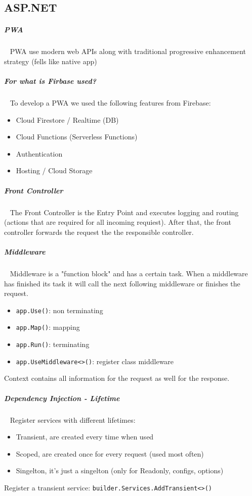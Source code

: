 \documentclass[11pt,twoside,landscape]{article}
\begin{document}
\begin{multicols}{4}
\section{ASP.NET}
\label{sec:org9b02759}
\subparagraph{PWA} \
\label{sec:org0b87818}
PWA use modern web APIs along with traditional progressive enhancement strategy (fells like native app)
\subparagraph{For what is Firbase used?} \
\label{sec:org6e1d08f}
To develop a PWA we used the following features from Firebase:
\begin{itemize}
\item Cloud Firestore / Realtime (DB)
\item Cloud Functions (Serverless Functions)
\item Authentication
\item Hosting / Cloud Storage
\end{itemize}
\subparagraph{Front Controller} \
\label{sec:org47d97a4}
The Front Controller is the Entry Point and executes logging and routing (actions that are required for all incoming requiest).
After that, the front controller forwards the request the the responsible controller.
\subparagraph{Middleware} \
\label{sec:org8682ac8}
Middleware is a "function block" and has a certain task.
When a middleware has finished its task it will call the next following middleware or finishes the request.
\begin{itemize}
\item \texttt{app.Use()}: non terminating
\item \texttt{app.Map()}: mapping
\item \texttt{app.Run()}: terminating
\item \texttt{app.UseMiddleware<>()}: register class middleware
\end{itemize}

Context contains all information for the request as well for the response.
\subparagraph{Dependency Injection - Lifetime} \
\label{sec:org3cf1800}
Register services with different lifetimes:
\begin{itemize}
\item Transient, are created every time when used
\item Scoped, are created once for every request (used most often)
\item Singelton, it's just a singelton (only for Readonly, configs, options)
\end{itemize}


Register a transient service: \texttt{builder.Services.AddTransient<>()}



\end{multicols}
\end{document}
